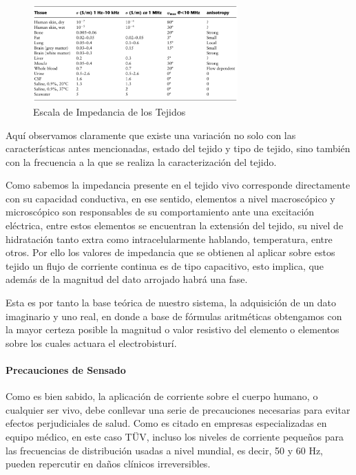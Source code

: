 \documentclass[12pt,letterpaper,spanish]{article}
\begin{document}
				\begin{figure}[H]
					\centering
					\includegraphics[width=0.7\textwidth]{./Imagenes/Imp_Tejido.png}
					\caption{Escala de Impedancia de los Tejidos}
				\end{figure}
			
				Aquí observamos claramente que existe una variación no solo con las características antes mencionadas, estado del tejido y tipo de tejido, sino también con la frecuencia a la que se realiza la caracterización del tejido. 
			
				Como sabemos la impedancia presente en el tejido vivo corresponde directamente con su capacidad conductiva, en ese sentido, elementos a nivel macroscópico y microscópico son responsables de su comportamiento ante una excitación eléctrica, entre estos elementos se encuentran la extensión del tejido, su nivel de hidratación tanto extra como intracelularmente hablando, temperatura, entre otros. Por ello los valores de impedancia que se obtienen al aplicar sobre estos tejido un flujo de corriente continua es de tipo capacitivo, esto implica, que además de la magnitud del dato arrojado habrá una fase.

				Esta es por tanto la base teórica de nuestro sistema, la adquisición de un dato imaginario y uno real, en donde a base de fórmulas aritméticas obtengamos con la mayor certeza posible la magnitud o valor resistivo del elemento o elementos sobre los cuales actuara el electrobisturí.

				\paragraph{Precauciones de Sensado}
				\hfill\break
				Como es bien sabido, la aplicación de corriente sobre el cuerpo humano, o cualquier ser vivo, debe conllevar una serie de precauciones necesarias para evitar efectos perjudiciales de salud. 
Como es citado en empresas especializadas en equipo médico, en este caso TÜV, incluso los niveles de corriente pequeños para las frecuencias de distribución usadas a nivel mundial, es decir, 50 y 60 Hz, pueden repercutir en daños clínicos irreversibles.
			
\end{document}
